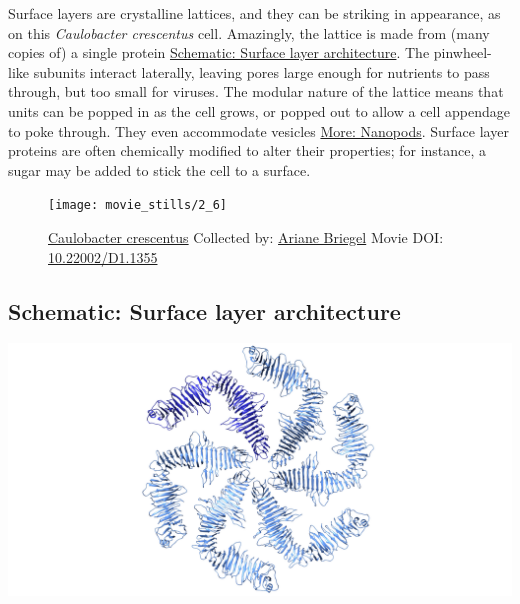 \documentclass[]{tufte-book}
\begin{document}
Surface layers are crystalline lattices, and they can be striking in
appearance, as on this \emph{Caulobacter crescentus} cell. Amazingly,
the lattice is made from (many copies of) a single protein
\protect\hyperlink{Surface_layer_architecture}{Schematic: Surface layer
architecture}. The pinwheel-like subunits interact laterally, leaving
pores large enough for nutrients to pass through, but too small for
viruses. The modular nature of the lattice means that units can be
popped in as the cell grows, or popped out to allow a cell appendage to
poke through. They even accommodate vesicles
\protect\hyperlink{Nanopods}{More: Nanopods}. Surface layer proteins are
often chemically modified to alter their properties; for instance, a
sugar may be added to stick the cell to a surface.





\begin{figure}
\texttt{[image: movie\_stills/2\_6]} \caption[\protect\hyperlink{tree}{Caulobacter crescentus} Collected by:
\protect\hyperlink{ariane_briegel}{Ariane Briegel} Movie DOI:
\href{https://doi.org/10.22002/D1.1355}{10.22002/D1.1355}]{\protect\hyperlink{tree}{Caulobacter crescentus} Collected by:
\protect\hyperlink{ariane_briegel}{Ariane Briegel} Movie DOI:
\href{https://doi.org/10.22002/D1.1355}{10.22002/D1.1355}}\label{fig:2-6}
\end{figure}

\hypertarget{Surface_layer_architecture}{\subsection*{Schematic: Surface
layer architecture}\label{Surface_layer_architecture}}

\includegraphics{img/schematics/2_6_1}
\end{document}
